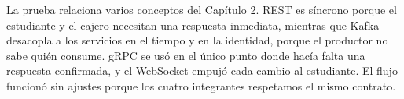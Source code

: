 La prueba relaciona varios conceptos del Capítulo 2. REST es síncrono porque el estudiante y el cajero necesitan una respuesta inmediata, mientras que Kafka desacopla a los servicios en el tiempo y en la identidad, porque el productor no sabe quién consume. gRPC se usó en el único punto donde hacía falta una respuesta confirmada, y el WebSocket empujó cada cambio al estudiante. El flujo funcionó sin ajustes porque los cuatro integrantes respetamos el mismo contrato.
